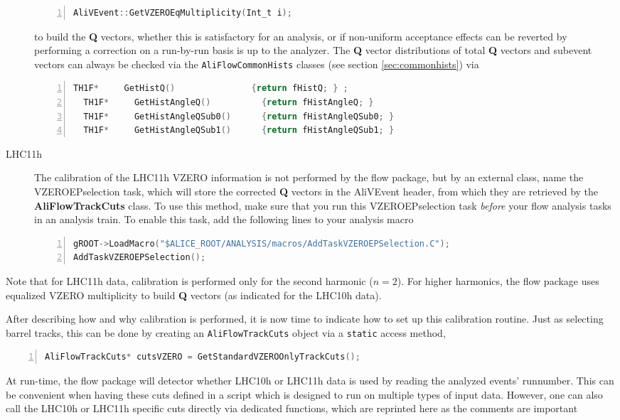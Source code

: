 \documentclass[a4paper]{book}
\numberwithin{equation}{subsection}
\begin{document}
\begin{description}
\begin{lstlisting}[language=C, numbers=left]
AliVEvent::GetVZEROEqMultiplicity(Int_t i);\end{lstlisting}
to build the \textbf{Q} vectors, whether this is satisfactory for an analysis, or if non-uniform acceptance effects can be reverted by performing a correction on a run-by-run basis is up to the analyzer. The \textbf{Q} vector distributions of total \textbf{Q} vectors and subevent vectors can always be checked via the \texttt{AliFlowCommonHists} classes (see section \ref{sec:commonhists}) via
\begin{lstlisting}[language=C, numbers=left]
  TH1F*     GetHistQ()               {return fHistQ; } ;  
  TH1F*     GetHistAngleQ()          {return fHistAngleQ; }
  TH1F*     GetHistAngleQSub0()      {return fHistAngleQSub0; }
  TH1F*     GetHistAngleQSub1()      {return fHistAngleQSub1; }\end{lstlisting}
\item [LHC11h] The calibration of the LHC11h VZERO information is not performed by the flow package, but by an external class, name the VZEROEPselection task, which will store the corrected \textbf{Q} vectors in the AliVEvent header, from which they are retrieved by the \textbf{AliFlowTrackCuts} class. To use this method, make sure that you run this VZEROEPselection task \emph{before} your flow analysis tasks in an analysis train. To enable this task, add the following lines to your analysis macro
\begin{lstlisting}[language=C, numbers=left]
gROOT->LoadMacro("$ALICE_ROOT/ANALYSIS/macros/AddTaskVZEROEPSelection.C");
AddTaskVZEROEPSelection();\end{lstlisting}
\end{description}
Note that for LHC11h data, calibration is performed only for the second harmonic ($n=2$). For higher harmonics, the flow package uses equalized VZERO multiplicity to build \textbf{Q} vectors (as indicated for the LHC10h data). 

After describing how and why calibration is performed, it is now time to indicate how to set up this calibration routine. Just as selecting barrel tracks, this can be done by creating an \texttt{AliFlowTrackCuts} object via a \texttt{static} access method,
\begin{lstlisting}[language=C, numbers=left]
AliFlowTrackCuts* cutsVZERO = GetStandardVZEROOnlyTrackCuts();\end{lstlisting}
At run-time, the flow package will detector whether LHC10h or LHC11h data is used by reading the analyzed events' runnumber. This can be convenient when having these cuts defined in a script which is designed to run on multiple types of input data. However, one can also call the LHC10h or LHC11h specific cuts directly via dedicated functions, which are reprinted here as the comments are important
\end{document}
